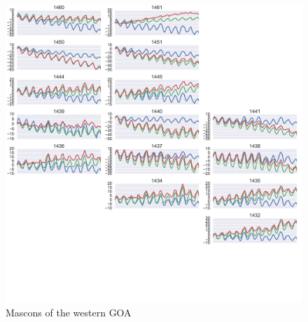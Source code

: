 \documentclass[review]{igs}
\begin{document}
\begin{figure}
\noindent\includegraphics[width=178mm]{figures/southeasternPlot} \centering \caption{Mascons of the western GOA} \label{fig:summer}
\end{figure}

\end{document}

